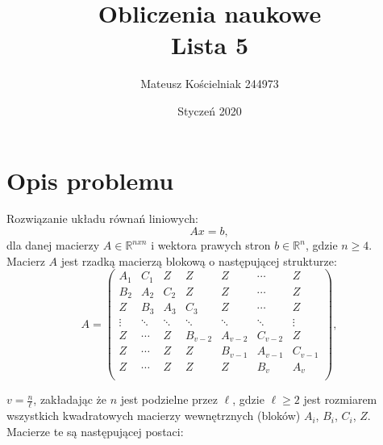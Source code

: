 \documentclass[12pt, a4paper]{article}
\title{\textbf{Obliczenia naukowe\\Lista 5}}
\author{Mateusz Kościelniak 244973\\}
\date{Styczeń 2020}
\begin{document}
\maketitle

\newpage

\section{Opis problemu}
Rozwiązanie układu równań liniowych:
\begin{equation}
Ax = b,
\end{equation}
dla danej macierzy $A \in \mathbb{R}^{nxn}$ 
i wektora prawych stron $b \in \mathbb{R}^n$, gdzie $n \geq 4$. \\

\noindent Macierz $A$ jest rzadką macierzą blokową o następującej strukturze:
\begin{equation}
A =
\left(\begin{array}{ccccccc}
A_1 & C_1 & Z & Z & Z & \cdots & Z \\
B_2 & A_2 & C_2 & Z & Z  & \cdots & Z \\
Z  & B_3 & A_3 & C_3 & Z  & \cdots & Z \\
\vdots & \ddots & \ddots & \ddots & \ddots & \ddots & \vdots\\
Z   & \cdots & Z  & B_{v-2} & A_{v-2} & C_{v-2} & Z \\
Z  & \cdots & Z  &  Z &B_{v-1} & A_{v-1} & C_{v-1}  \\
Z  & \cdots & Z & Z & Z& B_{v} & A_{v}  \\
\end{array}\right),
\end{equation} 

\noindent $v = \frac{n}{\ell}$, zakładając że $n$ jest podzielne przez $\ell$, gdzie $\ell \geq 2$ jest rozmiarem wszystkich kwadratowych macierzy wewnętrznych (bloków) $A_i$, $B_i$, $C_i$, $Z$. \\

\noindent Macierze te są następującej postaci:\\
\end{document}
